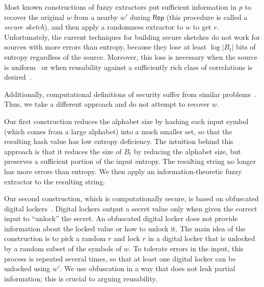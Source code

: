 \documentclass[11pt]{article}
\newcommand{\class}[1]{{\ensuremath{\mathsf{#1}}}}
\newcommand{\rep}{\ensuremath{\class{Rep}}\xspace}
\begin{document}

Most known constructions of fuzzy extractors put sufficient information in $p$ to recover the original $w$ from a nearby $w'$ during $\rep$ (this procedure is called a \emph{secure sketch}), and then apply a randomness extractor to $w$ to get $r$.
Unfortunately, the current techniques for building secure sketches do not work for sources with more errors than entropy, because they lose at least $\log |B_t|$ bits of entropy regardless of the source. Moreover, this loss is necessary when the source is uniform~\cite[Lemma C.1]{DBLP:journals/siamcomp/DodisORS08} or when reusability against a sufficiently rich class of correlations is desired~\cite[Theorem 11]{Boyen2004}. 

Additionally, computational definitions of security suffer from similar problems~\cite[Corollary 3.8, Theorem 3.10]{fuller2013computational}. Thus, we take a different approach and do not attempt to recover $w$.

Our first construction reduces the alphabet size by hashing each input symbol (which comes from a large alphabet) into a much smaller set, so that the resulting hash value has low entropy deficiency.
The intuition behind this approach is that it reduces the size of $B_t$ by reducing the alphabet size, but preserves a sufficient portion of the input entropy.  The resulting string no longer has more errors than entropy.
 We then apply an information-theoretic fuzzy extractor to the resulting string.

Our second construction, which is computationally secure, is based on obfuscated digital lockers~\cite{canetti2008obfuscating}. Digital lockers output a secret value only when given the correct input to ``unlock'' the secret. An obfuscated digital locker does not provide information about the locked value or how to unlock it.  The main idea of the construction is to pick a random $r$ and lock $r$ in a digital locker that is unlocked by a random subset of the symbols of $w$. To tolerate errors in the input, this process is repeated several times, so that at least one digital locker can be unlocked using $w'$. We use obfuscation in a way that does not leak partial information; this is crucial to arguing reusability.
\end{document}
